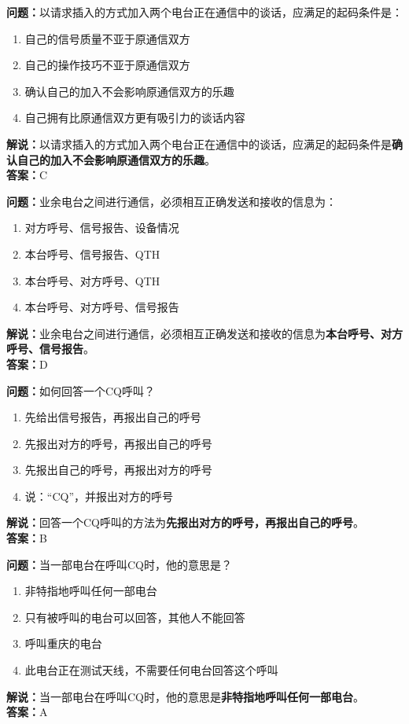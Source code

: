 \textbf{问题：}以请求插入的方式加入两个电台正在通信中的谈话，应满足的起码条件是：
\begin{enumerate}[label=\Alph*), leftmargin=1.5cm]
	\item 自己的信号质量不亚于原通信双方
	\item 自己的操作技巧不亚于原通信双方
	\item 确认自己的加入不会影响原通信双方的乐趣
	\item 自己拥有比原通信双方更有吸引力的谈话内容
\end{enumerate}
\textbf{解说：}以请求插入的方式加入两个电台正在通信中的谈话，应满足的起码条件是\textbf{确认自己的加入不会影响原通信双方的乐趣}。\\\textbf{答案：}C



\textbf{问题：}业余电台之间进行通信，必须相互正确发送和接收的信息为：
\begin{enumerate}[label=\Alph*), leftmargin=1.5cm]
	\item 对方呼号、信号报告、设备情况
	\item 本台呼号、信号报告、QTH
	\item 本台呼号、对方呼号、QTH
	\item 本台呼号、对方呼号、信号报告
\end{enumerate}
\textbf{解说：}业余电台之间进行通信，必须相互正确发送和接收的信息为\textbf{本台呼号、对方呼号、信号报告}。\\\textbf{答案：}D



\textbf{问题：}如何回答一个CQ呼叫？
\begin{enumerate}[label=\Alph*), leftmargin=1.5cm]
	\item 先给出信号报告，再报出自己的呼号
	\item 先报出对方的呼号，再报出自己的呼号
	\item 先报出自己的呼号，再报出对方的呼号
	\item 说：“CQ”，并报出对方的呼号
\end{enumerate}
\textbf{解说：}回答一个CQ呼叫的方法为\textbf{先报出对方的呼号，再报出自己的呼号}。\\\textbf{答案：}B



\textbf{问题：}当一部电台在呼叫CQ时，他的意思是？
\begin{enumerate}[label=\Alph*), leftmargin=1.5cm]
	\item 非特指地呼叫任何一部电台
	\item 只有被呼叫的电台可以回答，其他人不能回答
	\item 呼叫重庆的电台
	\item 此电台正在测试天线，不需要任何电台回答这个呼叫
\end{enumerate}
\textbf{解说：}当一部电台在呼叫CQ时，他的意思是\textbf{非特指地呼叫任何一部电台}。\\\textbf{答案：}A



